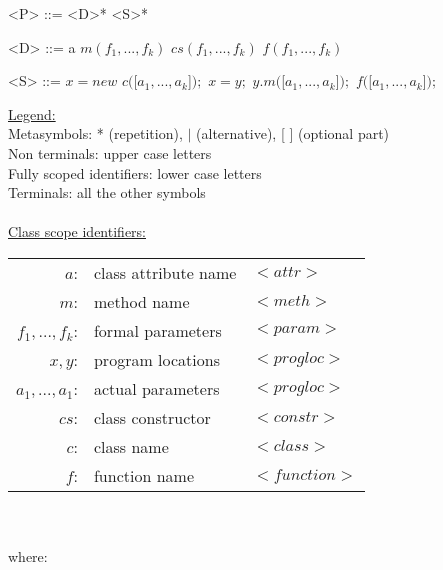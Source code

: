 \documentclass[preview,border=20pt,varwidth]{standalone}
\begin{document}
\begin{numberedgrammar}

<P> ::= <D>* <S>*

<D> ::= a
\alt $m(f_1,...,f_k)$
\alt $cs(f_1,...,f_k)$
\alt $f(f_1,...,f_k)$

<S> ::= $x = new$ $c($[$a_1, ..., a_k$]$);$
\alt $x = y;$
\alt [$x =$] $y.m($[$a_1, ..., a_k$]$);$
\alt [$x =$] $f($[$a_1, ..., a_k$]$);$
\end{numberedgrammar}

\noindent
\underline{Legend:} \\
\noindent
Metasymbols: * (repetition), $|$ (alternative), [ ] (optional part) \\
Non terminals: upper case letters \\
Fully scoped identifiers: lower case letters \\
Terminals: all the other symbols \\
\\
\underline{Class scope identifiers:} \\
\begin{small}
\begin{tabular}{ r l l }
    $a$: & class attribute name & $<attr>$ \\
    $m$: & method name & $<meth>$ \\
    $f_1, ..., f_k$: & formal parameters & $<param>$ \\
    $x,y$: & program locations & $<progloc>$ \\
    $a_1, ..., a_1$: & actual parameters & $<progloc>$ \\
    $cs$: & class constructor & $<constr>$ \\
    $c$: & class name & $<class>$ \\
    $f$: & function name & $<function>$ \\
\end{tabular}
\end{small}
\\ \\
where: \\
\end{document}
